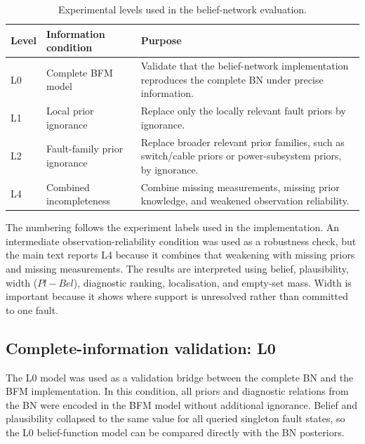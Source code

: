 \documentclass[runningheads]{llncs}
\begin{document}
\begin{table}[H]
\caption{Experimental levels used in the belief-network evaluation.}\label{tab:experiment_levels}
\centering
\small
\begin{tabularx}{\textwidth}{p{1.0cm}p{3.0cm}X}
\toprule
Level & Information condition & Purpose \\
\midrule
L0 & Complete BFM model & Validate that the belief-network implementation reproduces the complete BN under precise information. \\
L1 & Local prior ignorance & Replace only the locally relevant fault priors by ignorance. \\
L2 & Fault-family prior ignorance & Replace broader relevant prior families, such as switch/cable priors or power-subsystem priors, by ignorance. \\
L4 & Combined incompleteness & Combine missing measurements, missing prior knowledge, and weakened observation reliability. \\
\bottomrule
\end{tabularx}
\end{table}

The numbering follows the experiment labels used in the implementation. An intermediate observation-reliability condition was used as a robustness check, but the main text reports L4 because it combines that weakening with missing priors and missing measurements. The results are interpreted using belief, plausibility, width ($Pl-Bel$), diagnostic ranking, localisation, and empty-set mass. Width is important because it shows where support is unresolved rather than committed to one fault.

\subsection{Complete-information validation: L0}
\label{sec:l0_validation}

The L0 model was used as a validation bridge between the complete BN and the BFM implementation. In this condition, all priors and diagnostic relations from the BN were encoded in the BFM model without additional ignorance. Belief and plausibility collapsed to the same value for all queried singleton fault states, so the L0 belief-function model can be compared directly with the BN posteriors.
\end{document}
